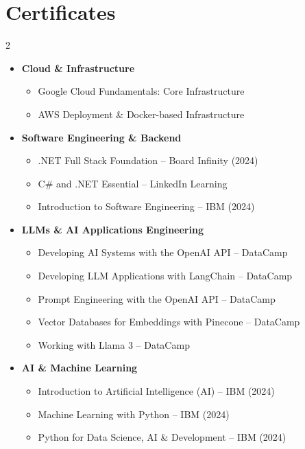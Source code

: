 \documentclass[a4paper,11pt]{article}
\newcommand{\resumeSubHeadingListStart}{\begin{itemize}[leftmargin=*]}
\newcommand{\resumeSubHeadingListEnd}{\end{itemize}}
\begin{document}
\section{Certificates}
  \vspace{-5pt}
  \begin{multicols}{2}
  \resumeSubHeadingListStart
    \item{\textbf{Cloud \& Infrastructure}}
    \begin{itemize}[leftmargin=0.15in]
      \item Google Cloud Fundamentals: Core Infrastructure
      \item AWS Deployment \& Docker-based Infrastructure
    \end{itemize}
    
    \item{\textbf{Software Engineering \& Backend}}
    \begin{itemize}[leftmargin=0.15in]
      \item .NET Full Stack Foundation -- Board Infinity (2024)
      \item C\# and .NET Essential -- LinkedIn Learning
      \item Introduction to Software Engineering -- IBM (2024)
    \end{itemize}
    
    \item{\textbf{LLMs \& AI Applications Engineering}}
    \begin{itemize}[leftmargin=0.15in]
      \item Developing AI Systems with the OpenAI API -- DataCamp
      \item Developing LLM Applications with LangChain -- DataCamp
      \item Prompt Engineering with the OpenAI API -- DataCamp
      \item Vector Databases for Embeddings with Pinecone -- DataCamp
      \item Working with Llama 3 -- DataCamp
    \end{itemize}
    
\item{\textbf{AI \& Machine Learning}}
    \begin{itemize}[leftmargin=0.15in]
      \item Introduction to Artificial Intelligence (AI) -- IBM (2024)
      \item Machine Learning with Python -- IBM (2024)
      \item Python for Data Science, AI \& Development -- IBM (2024)
    \end{itemize}

  \resumeSubHeadingListEnd
  \end{multicols}

\end{document}
